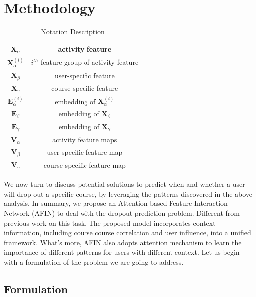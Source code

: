 \section{Methodology}

\begin{table}[]
    \caption{Notation Description}
    \centering
    \begin{tabular}{c|c}
    \hline
       $\mathbf{X}_{\alpha}$  & activity feature \\ \hline
       $\mathbf{X}_{\alpha}^{(i)}$ & $i^{th}$ feature group of activity feature \\ \hline
       $\mathbf{X}_{\beta}$  & user-specific feature \\ \hline
       $\mathbf{X}_{\gamma}$   & course-specific feature \\ \hline
       $\textbf{E}^{(i)}_\alpha$ & embedding of $\mathbf{X}_{\alpha}^{(i)}$ \\ \hline
       $\mathbf{E}_\beta$ & embedding of   $\mathbf{X}_{\beta}$ \\ \hline
        $\mathbf{E}_\gamma$ & embedding of   $\mathbf{X}_{\gamma}$ \\ \hline
         $\textbf{V}_\alpha$ &  activity feature maps \\ \hline
       $\mathbf{V}_\beta$ & user-specific feature map \\ \hline
        $\mathbf{V}_\gamma$ & course-specific feature map\\ \hline
    \end{tabular}
    \label{tab:my_label}
\end{table}

We now turn to discuss potential solutions to predict when and whether a user will drop out a specific course, 
by leveraging the patterns discovered in the above analysis. In summary, we propose an Attention-based Feature Interaction Network (AFIN) to deal with the dropout prediction problem. Different from previous work on this task. The proposed model incorporates context information, including course course correlation and user influence, into a unified framework. What's more, AFIN also adopts attention mechanism to learn the importance of different patterns for users with different context. 
Let us begin with a formulation of the problem we are going to address.

\subsection{Formulation}
	\label{ProblemDef}
	

